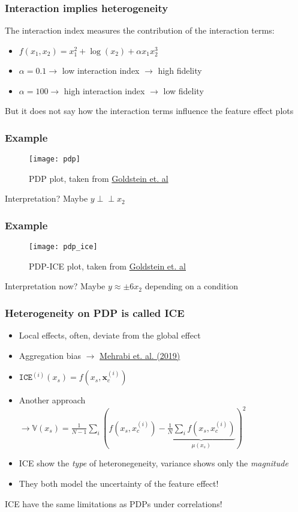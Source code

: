 \begin{frame}
  \frametitle{Interaction implies heterogeneity}
  The interaction index measures the contribution of the interaction terms:

  \begin{itemize}
    \item \(f(x_1, x_2) = x_1^2 + \log(x_2) + \alpha x_1x_2^3\)
    \item \(\alpha = 0.1 \rightarrow\) low interaction index \(\rightarrow\) high fidelity
    \item \(\alpha = 100 \rightarrow\) high interaction index \(\rightarrow\) low fidelity
    \end{itemize}
  \noindent\makebox[\linewidth]{\rule{\paperwidth}{0.4pt}}
  But it does not say how the interaction terms influence the feature effect plots
\end{frame}


\begin{frame}
  \frametitle{Example}
  \begin{figure}
    \centering
    \texttt{[image: pdp]}
    \caption{PDP plot, taken from \href{https://arxiv.org/abs/1309.6392}{Goldstein et. al}}
  \end{figure}
  \noindent\makebox[\linewidth]{\rule{\paperwidth}{0.4pt}}
  Interpretation?
  Maybe $y \perp\!\!\!\!\perp x_2$
\end{frame}

\begin{frame}
  \frametitle{Example}
  \begin{figure}
    \centering
    \texttt{[image: pdp\_ice]}
    \caption{PDP-ICE plot, taken from \href{https://arxiv.org/abs/1309.6392}{Goldstein et. al}}
  \end{figure}
  \noindent\makebox[\linewidth]{\rule{\paperwidth}{0.4pt}}
  Interpretation now? Maybe $y \approx \pm 6 x_2 $ depending on a condition
\end{frame}

\begin{frame}
  \frametitle{Heterogeneity on PDP is called ICE}
  \begin{itemize}
    \item Local effects, often, deviate from the global effect
    \item Aggregation bias $\rightarrow$ \href{https://arxiv.org/pdf/1908.09635.pdf}{Mehrabi et. al. (2019)}
    \item $\mathtt{ICE}^{(i)}(x_s) = f(x_s, \mathbf{x}_c^{(i)})$
    \item Another approach $\rightarrow \mathbb{V}(x_s) = \frac{1}{N-1}\sum_i \left ( f(x_s, x_c^{(i)}) - \underbrace{\frac{1}{N} \sum_i f(x_s, x_c^{(i)})}_{\mu(x_s)} \right)^2$
    \item ICE show the \emph{type} of heteronegeneity, variance shows only the \emph{magnitude}
    \item They both model the uncertainty of the feature effect!
  \end{itemize}
  \noindent\makebox[\linewidth]{\rule{\paperwidth}{0.4pt}}
  ICE have the same limitations as PDPs under correlations!
\end{frame}

